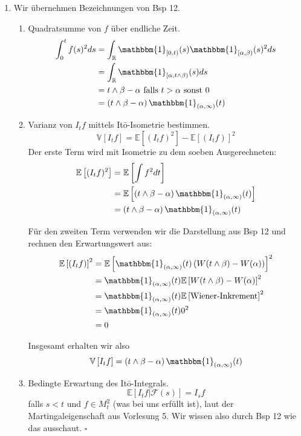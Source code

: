 \documentclass[a4paper,11pt,notitlepage,fullpage]{article}
\newcommand{\E}{\mathbb E}
\newcommand{\V}{\mathbb V}
\newcommand{\ind}{\mathbbm{1}}
\begin{document}
\begin{enumerate}
\item Wir übernehmen Bezeichnungen von Bsp 12.
\begin{enumerate}
\item Quadratsumme von $f$ über endliche Zeit.
\begin{align*}
\int_0^t f(s)^2 ds &= \int_{\mathbb{R}} \ind_{[0, t)}(s) \ind_{[\alpha, \beta)} (s)^2 ds\\
&= \int_{\mathbb{R}} \ind_{[\alpha, t\wedge\beta)}(s) ds\\
&= t\wedge\beta - \alpha \text{ falls } t>\alpha \text{ sonst } 0\\
&= \left(t\wedge\beta - \alpha\right) \ind_{(\alpha, \infty)}(t)
\end{align*}

\item Varianz von $I_t f$ mittels Itō-Isometrie bestimmen.
$$\V\left[ I_t f\right] = \E\left[ (I_t f)^2 \right] - \E\left[ (I_t f) \right]^2$$
Der erste Term wird mit Isometrie zu dem soeben Ausgerechneten:
\begin{align*}
\E\left[ (I_t f)^2 \right] &= \E\left[ \int f^2 dt \right]\\
&= \E\left[\left(t\wedge\beta - \alpha\right)\ind_{(\alpha, \infty)}(t)\right]\\
&= \left(t\wedge\beta - \alpha\right)\ind_{(\alpha, \infty)}(t)
\end{align*}

Für den zweiten Term verwenden wir die Darstellung aus Bsp 12 und rechnen den Erwartungswert aus:
\begin{align*}
\E\left[ (I_t f) \right]^2 &= \E\left[ \ind_{(\alpha, \infty)}(t) \left( W(t\wedge\beta) - W(\alpha) \right)\right]^2\\
&= \ind_{(\alpha, \infty)}(t) \E\left[ W(t\wedge\beta) - W(\alpha)\right]^2\\
&= \ind_{(\alpha, \infty)}(t) \E\left[ \text{Wiener-Inkrement}\right]^2\\
&= \ind_{(\alpha, \infty)}(t) 0^2\\
&= 0
\end{align*}

Insgesamt erhalten wir also
$$\V\left[ I_t f\right] = \left(t\wedge\beta - \alpha\right)\ind_{(\alpha, \infty)}(t)$$

\item Bedingte Erwartung des Itō-Integrals.
$$\E \left[ I_t f | \mathcal{F}(s)\right] = I_s f$$
falls $s<t$ und $f\in M_t^2$ (was bei uns erfüllt ist), laut der Martingaleigenschaft aus Vorlesung 5. Wir wissen also durch Bsp 12 wie das ausschaut.
\hfill $\square$



\end{enumerate}
\end{enumerate}
\end{document}
